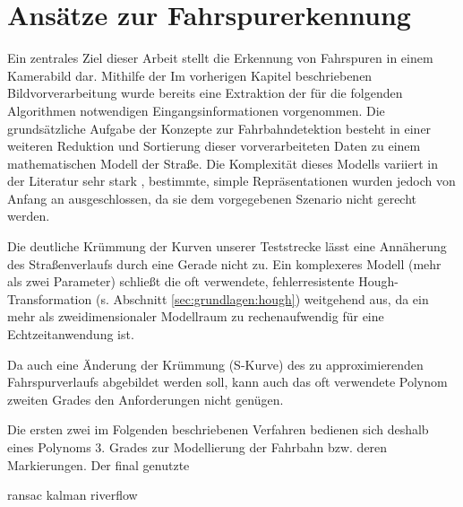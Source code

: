 \chapter{Ansätze zur Fahrspurerkennung \dcsecondauthorshort}
\label{cha:fahrspurerkennung}
Ein zentrales Ziel dieser Arbeit stellt die Erkennung von Fahrspuren in einem Kamerabild dar. Mithilfe der Im vorherigen Kapitel beschriebenen Bildvorverarbeitung wurde bereits eine Extraktion der für die folgenden Algorithmen notwendigen Eingangsinformationen vorgenommen. Die grundsätzliche Aufgabe der Konzepte zur Fahrbahndetektion besteht in einer weiteren Reduktion und Sortierung dieser vorverarbeiteten Daten zu einem mathematischen Modell der Straße. Die Komplexität dieses Modells variiert in der Literatur sehr stark \autocite{naroteReviewRecentAdvances2018}, bestimmte, simple Repräsentationen wurden jedoch von Anfang an ausgeschlossen, da sie dem vorgegebenen Szenario nicht gerecht werden. 

Die deutliche Krümmung der Kurven unserer Teststrecke lässt eine Annäherung des Straßenverlaufs durch eine Gerade nicht zu. Ein komplexeres Modell (mehr als zwei Parameter) schließt die oft verwendete, fehlerresistente Hough-Transformation (s. Abschnitt \ref{sec:grundlagen:hough}) weitgehend aus, da ein mehr als zweidimensionaler Modellraum zu rechenaufwendig für eine Echtzeitanwendung ist. 

Da auch eine Änderung der Krümmung (S-Kurve) des zu approximierenden Fahrspurverlaufs abgebildet werden soll, kann auch das oft verwendete Polynom zweiten Grades den Anforderungen nicht genügen. 

Die ersten zwei im Folgenden beschriebenen Verfahren bedienen sich deshalb eines Polynoms 3. Grades zur Modellierung der Fahrbahn bzw. deren Markierungen. Der final genutzte 

{ransac}
{kalman}
{riverflow}
